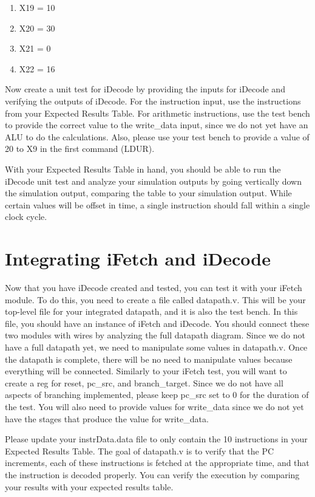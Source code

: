 \begin{enumerate}
	\item X19 = 10
	\item X20 = 30
	\item X21 = 0
	\item X22 = 16
\end{enumerate}

Now create a unit test for iDecode by providing the inputs for iDecode and verifying the outputs of iDecode.  For the instruction input, use the instructions from your Expected Results Table.  For arithmetic instructions, use the test bench to provide the correct value to the write\_data input, since we do not yet have an ALU to do the calculations.  Also, please use your test bench to provide a value of 20 to X9 in the first command (LDUR).

With your Expected Results Table in hand, you should be able to run the iDecode unit test and analyze your simulation outputs by going vertically down the simulation output, comparing the table to your simulation output.  While certain values will be offset in time, a single instruction should fall within a single clock cycle.  

\section{Integrating iFetch and iDecode}
Now that you have iDecode created and tested, you can test it with your iFetch module.  To do this, you need to create a file called datapath.v.  This will be your top-level file for your integrated datapath, and it is also the test bench.  In this file, you should have an instance of iFetch and iDecode.  You should connect these two modules with wires by analyzing the full datapath diagram.  Since we do not have a full datapath yet, we need to manipulate some values in datapath.v.  Once the datapath is complete, there will be no need to manipulate values because everything will be connected.  Similarly to your iFetch test, you will want to create a reg for reset, pc\_src, and branch\_target.  Since we do not have all aspects of branching implemented, please keep pc\_src set to 0 for the duration of the test.  You will also need to provide values for write\_data since we do not yet have the stages that produce the value for write\_data.  

Please update your instrData.data file to only contain the 10 instructions in your Expected Results Table.  The goal of datapath.v is to verify that the PC increments, each of these instructions is fetched at the appropriate time, and that the instruction is decoded properly.  You can verify the execution by comparing your results with your expected results table.     

